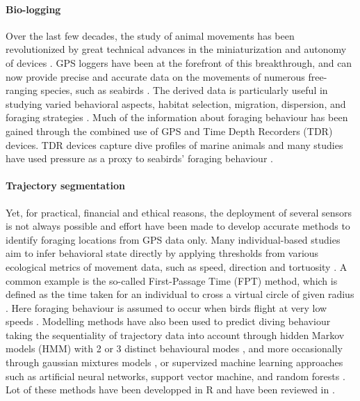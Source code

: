 \documentclass{article}
\begin{document}
\paragraph{Bio-logging}
Over the last few decades, the study of animal movements has been revolutionized by great technical advances in the miniaturization and autonomy of devices \cite{hussey_aquatic_2015,ropert-coudert_diving_2009,monaco_bio-logging_2016}.
GPS loggers have been at the forefront of this breakthrough, and can now provide precise and accurate data on the movements of numerous free-ranging species, such as seabirds \cite{wakefield_quantifying_2009,yoda_advances_2019}.
The derived data is particularly useful in studying varied behavioral aspects, habitat selection, migration, dispersion, and foraging
strategies \cite{nathan_movement_2008}.
Much of the information about foraging behaviour has been gained through the combined use of GPS and Time Depth Recorders (TDR) devices.
TDR devices capture dive profiles of marine animals and many studies have used pressure as a proxy to seabirds' foraging behaviour \cite{cox_seabird_2016,lewis_flexible_2004,shoji_foraging_2015}.

\paragraph{Trajectory segmentation}
Yet, for practical, financial and ethical reasons, the deployment of several sensors is not always possible and effort have been made to develop accurate methods to identify foraging locations from GPS data only.
Many individual-based studies aim to infer behavioral state directly by applying thresholds from various ecological metrics of movement data, such as speed, direction and tortuosity \cite{dean_simultaneous_2015,seidel_ecological_2018}. A common example is the so-called First-Passage Time (FPT) method, which is defined as the time taken for an individual to cross a virtual circle of given radius \cite{carter_navigating_2016,pinaud_at-sea_2007,sommerfeld_foraging_2013}. Here foraging behaviour is assumed to occur when birds flight at very low speeds \cite{weimerskirch_foraging_2008}.
Modelling methods have also been used to predict diving behaviour taking the sequentiality of trajectory data into account through hidden Markov models (HMM) with 2 or 3 distinct behavioural modes \cite{boyd_movement_2014,dunphy_seabirds_2020,mcclintock_momentuhmm_2018,oppel_foraging_2015}, and more occasionally through gaussian mixtures models \cite{guilford_gps_2008,mendez_geographical_2017}, or supervized machine learning approaches such as artificial neural networks, support vector machine, and random forests \cite{guilford_migration_2009, wang_machine_2019}. Lot of these methods have been developped in R and have been reviewed in \cite{joo_navigating_2020}.
\end{document}
